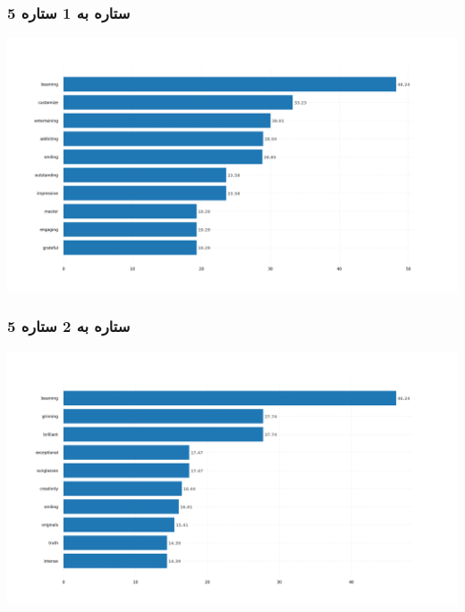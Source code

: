 \subsubsection{\Large 5 ستاره به 1 ستاره}
            { \selectfont \setLR
            \begin{center}
            \includegraphics[scale=0.4]{Images/rel_norm_freq_5_1.png}
            \end{center}
            \begin{adjustbox}{width=\textwidth}
            \end{adjustbox}
            }
\subsubsection{\Large 5 ستاره به 2 ستاره}
            { \selectfont \setLR
            \begin{center}
            \includegraphics[scale=0.4]{Images/rel_norm_freq_5_2.png}
            \end{center}
            \begin{adjustbox}{width=\textwidth}
            \end{adjustbox}
            }
